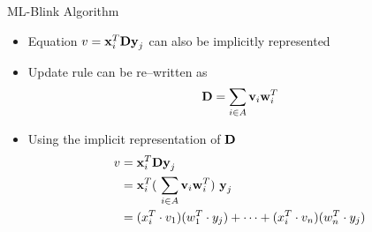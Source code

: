 \begin{frame}{ML-Blink Algorithm}
    \begin{itemize}
        \item Equation $v = \boldsymbol{\mathbf{x}}_{i}^{T} \boldsymbol{\mathbf{D}} \boldsymbol{\mathbf{y}}_j$ can also be implicitly represented
        \item Update rule can be re--written as 
            \begin{equation} \nonumber
                \boldsymbol{\mathbf{D}} = \sum_{i \in A} \boldsymbol{\mathbf{v}}_i \boldsymbol{\mathbf{w}}_i^T
            \end{equation}
        \item Using the implicit representation of $\boldsymbol{\mathbf{D}}$
            \begin{equation} \label{eq:v-implicit}
                \begin{split}
                    v &= \boldsymbol{\mathbf{x}}_i^T \boldsymbol{\mathbf{D}} \boldsymbol{\mathbf{y}}_j \\
                    &= \boldsymbol{\mathbf{x}}_i^T (\ \sum_{i \in A} \boldsymbol{\mathbf{v}}_i \boldsymbol{\mathbf{w}}_i^T )\ \boldsymbol{\mathbf{y}}_j \\
                    &= ( x_i^T \cdot v_1 )  ( w_1^T \cdot y_j ) + \cdots + ( x_i^T \cdot v_n )  ( w_n^T \cdot y_j ) \\
                \end{split}
            \end{equation}
    \end{itemize}
\end{frame}